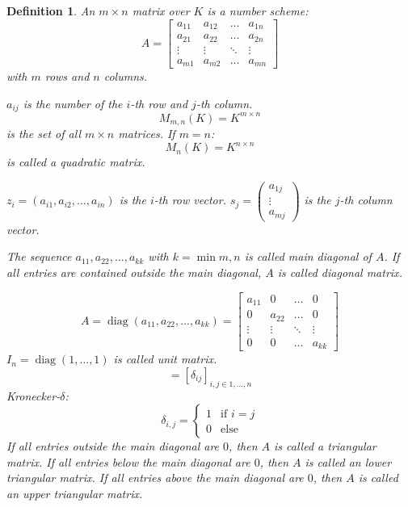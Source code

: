 \documentclass[a4paper,landscape,twocolumn]{article}
\newtheorem{defi}{Definition}
\begin{document}
\begin{defi}
  \label{definition-6-1}
  An $m \times n$ matrix over $K$ is a number scheme:
  \[
    A = \begin{bmatrix}
      a_{11} & a_{12} & \ldots & a_{1n} \\
      a_{21} & a_{22} & \ldots & a_{2n} \\
      \vdots & \vdots & \ddots & \vdots \\
      a_{m1} & a_{m2} & \ldots & a_{mn}
    \end{bmatrix}
  \]
  with $m$ rows and $n$ columns.

  $a_{ij}$ is the number of the $i$-th row and $j$-th column.
  \[ M_{m,n}(K) = K^{m\times n} \]
  is the set of all $m \times n$ matrices.
  If $m=n$:
  \[ M_n(K) = K^{n\times n} \]
  is called a \emph{quadratic matrix}.

  $z_i = (a_{i1}, a_{i2}, \dots, a_{in})$ is the $i$-th row vector.
  $s_j = \begin{pmatrix} a_{1j} \\ \vdots \\ a_{mj} \end{pmatrix}$ is the $j$-th column vector.

  The sequence $a_{11}, a_{22}, \dots, a_{kk}$ with $k = \min{m,n}$ is called main diagonal of $A$.
  If all entries are contained outside the main diagonal, $A$ is called \emph{diagonal matrix}.

  \[
    A = \operatorname{diag}(a_{11}, a_{22}, \dots, a_{kk})
      = \begin{bmatrix}
        a_{11} & 0 & \ldots & 0 \\
        0 & a_{22} & \ldots & 0 \\
        \vdots & \vdots & \ddots & \vdots \\
        0 & 0 & \ldots & a_{kk}
      \end{bmatrix}
  \]
  $I_n = \operatorname{diag}(1, \dots, 1)$ is called \emph{unit matrix}.
  \[ = [\delta_{ij}]_{i,j \in 1,\dots,n} \]
  Kronecker-$\delta$:
  \[
    \delta_{i,j} = \begin{cases}
      1 & \text{if } i = j \\
      0 & \text{else}
    \end{cases}
  \]
  If all entries outside the main diagonal are $0$, then $A$ is called a \emph{triangular matrix}.
  If all entries below the main diagonal are $0$, then $A$ is called an \emph{lower triangular matrix}.
  If all entries above the main diagonal are $0$, then $A$ is called an \emph{upper triangular matrix}.


\end{defi}
\end{document}
